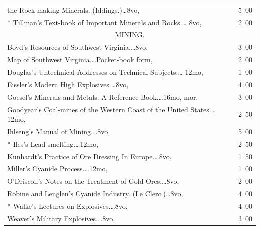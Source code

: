 \documentclass[a4paper,12pt]{book}[2004/02/16]
\theoremstyle{ilemma}
\theoremstyle{itheorem}
\theoremstyle{iother}
\theoremstyle{icorollary}
\theoremstyle{numcorollary}
\theoremstyle{idefinition}
\begin{document}
\begin{longtable}{@{}l@{ }r@{}}
\nopagebreak

\indent\indent the Rock-making Minerals. (Iddings.)\dotfill\ldots 8vo,
& 5\ 00\\

* Tillman's Text-book of Important Minerals and Rocks.\dotfill\ldots
  8vo, & 2\ 00\\[3em]



\multicolumn{2}{c}{\large MINING.}\\[1em]

\nopagebreak

Boyd's Resources of Southwest Virginia.\dotfill\ldots 8vo, & 3\ 00\\

\indent Map of Southwest Virginia.\dotfill\ldots Pocket-book form, & 2\ 00\\

Douglas's Untechnical Addresses on Technical Subjects.\dotfill\ldots
12mo, & 1\ 00\\

Eissler's Modern High Explosives.\dotfill\ldots 8vo, & 4\ 00\\

Goesel's Minerals and Metals: A Reference Book.\dotfill\ldots 16mo,
mor. & 3\ 00\\

Goodyear's Coal-mines of the Western Coast of the United
States.\dotfill\ldots 12mo, & 2\ 50\\

Ihlseng's Manual of Mining.\dotfill\ldots 8vo, & 5\ 00\\

* Iles's Lead-smelting.\dotfill\ldots 12mo, & 2\ 50\\

Kunhardt's Practice of Ore Dressing In Europe.\dotfill\ldots 8vo, & 1\ 50\\

Miller's Cyanide Process.\dotfill\ldots 12mo, & 1\ 00\\

O'Driscoll's Notes on the Treatment of Gold Ores.\dotfill\ldots 8vo, &
2\ 00\\

Robine and Lenglen's Cyanide Industry. (Le Clerc.)\dotfill\ldots 8vo,
& 4\ 00\\

* Walke's Lectures on Explosives.\dotfill\ldots 8vo, & 4\ 00\\

Weaver's Military Explosives.\dotfill\ldots 8vo, & 3\ 00\\


\end{longtable}
\end{document}
